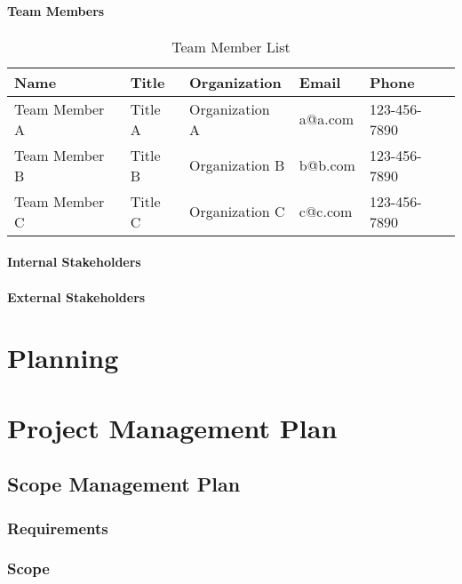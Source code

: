 \documentclass[12pt,letterpaper]{report}
\begin{document}
		\subsection{Team Members}
			\begin{table}[!htbp]
				\small
				\begin{tabularx}{\textwidth}{|X|X|X|X|l|}
					\hline
					\textbf{Name} & \textbf{Title} & \textbf{Organization} & \textbf{Email} & \textbf{Phone} \\ \hline
					Team Member A & Title A        & Organization A        & a@a.com        & 123-456-7890   \\ \hline
					Team Member B & Title B        & Organization B        & b@b.com        & 123-456-7890   \\ \hline
					Team Member C & Title C        & Organization C        & c@c.com        & 123-456-7890   \\ \hline
				\end{tabularx}
				\caption{Team Member List}
			\end{table}
			\normalfont

	\subsection{Internal Stakeholders}
	\subsection{External Stakeholders}
	
	
	\part{Planning}
	\part*{Project Management Plan}
	
	\chapter{Scope Management Plan}
	\section{Requirements}
	\section{Scope}
\end{document}
